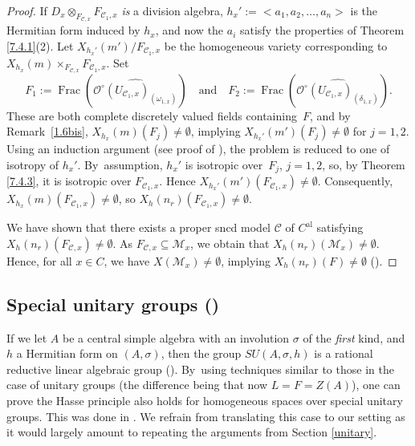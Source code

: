 \documentclass[JEP,XML,SOM,Unicode,NoFloatCountersInSection,published]{cedram}
\newcommand{\al}{\mathrm{al}}
\DeclareMathOperator{\Frac}{Frac}
\theoremstyle{definition}
\begin{document}
\begin{proof}
If $D_x \otimes_{F_{\mathscr{C},x}} F_{\mathscr{C}_1,x}$ \emph{is} a division algebra, $h_x':=<a_1, a_2, \dots, a_n>$ is the Hermitian form induced by $h_x$, and now the $a_i$
satisfy the properties of Theorem \ref{7.4.1}(2). Let $X_{h_x'}(m')/F_{\mathscr{C}_1,x}$ be the homogeneous variety corresponding to $X_{h_x}(m) \times_{F_{\mathscr{C},x}} F_{\mathscr{C}_1,x}$. Set
\[
F_1:=\Frac(\widehat{\mathcal{O}^{\circ}(U_{{\mathscr{C}_1,x}})_{(\omega_{1,x})}})\quad\text{and}\quad F_2:=\Frac(\widehat{\mathcal{O}^{\circ}(U_{\mathscr{C}_1,x})_{(\delta_{1,x})}}).
\]
These are both complete discretely valued fields containing~$F$, and by Remark~\ref{1.6bis}, $X_{h_x}(m)(F_j) \neq \emptyset$, implying $X_{h_x'}(m')(F_j) \neq \emptyset$ for $j=1,2$.
Using an induction argument (see proof of \cite[Th.\,12.2]{parsur}), the problem is reduced to one of isotropy of $h_x'$. By~assumption, $h_x'$ is isotropic over~$F_j$, $j=1,2$, so, by Theorem \ref{7.4.3}, it is isotropic over $F_{\mathscr{C}_1,x}$. Hence $X_{h_x'}(m')(F_{\mathscr{C}_1,x})\neq \emptyset$. Consequently, $X_{h_x}(m)(F_{\mathscr{C}_1,x}) \neq \emptyset$, so $X_{h}(n_r)(F_{\mathscr{C}_1,x}) \neq \emptyset$.

We have shown that there exists a proper sncd model $\mathscr{C}$ of $C^{\al}$ satisfying ${X_h(n_r)(F_{\mathscr{C},x}) \neq \emptyset}$. As $F_{\mathscr{C},x} \subseteq \mathscr{M}_x$, we obtain that $X_h(n_r)(\mathscr{M}_x) \neq \emptyset$.
Hence, for all $x \in C$, we have $X(\mathscr{M}_x) \neq \emptyset$, implying ${X_h(n_r)(F) \neq \emptyset}$ (\cf \cite[Th.\,3.11]{une}).
\end{proof}
\subsection{Special unitary groups (\cf \cite{wu})} \label{subsection7.2}
If we let $A$ be a central simple algebra with an involution $\sigma$ of the \emph{first} kind, and $h$ a Hermitian form on $(A, \sigma)$, then the group $\textit{SU}(A, \sigma, h)$ is a rational reductive linear algebraic group (\cf \cite[Lem.\,5]{plati}). By~using techniques similar to those in the case of unitary groups (the difference being that now ${L=F=Z(A)}$), one can prove the Hasse principle also holds for homogeneous spaces over special unitary groups. This was done in \cite{wu}. We refrain from translating this case to our setting as it would largely amount to repeating the arguments from Section \ref{unitary}.

\backmatter


\end{document}
